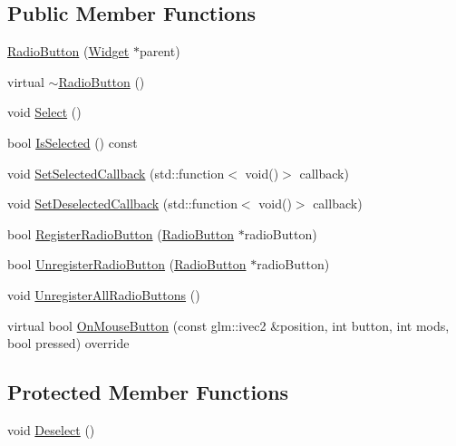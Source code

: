 \subsection*{Public Member Functions}
\begin{DoxyCompactItemize}
\item 
\mbox{\hyperlink{classngl__gui_1_1_radio_button_a919cbf40d57d74418b5a38fe4e6754f2}{Radio\+Button}} (\mbox{\hyperlink{classngl__gui_1_1_widget}{Widget}} $\ast$parent)
\item 
virtual \mbox{\hyperlink{classngl__gui_1_1_radio_button_ab31789870bcefcfc9abc45fa3881a2ef}{$\sim$\+Radio\+Button}} ()
\item 
void \mbox{\hyperlink{classngl__gui_1_1_radio_button_a175e3625d976ea82c99c16f6fa64a5fb}{Select}} ()
\item 
bool \mbox{\hyperlink{classngl__gui_1_1_radio_button_aee5f82544897695560fac4cfa7359016}{Is\+Selected}} () const
\item 
void \mbox{\hyperlink{classngl__gui_1_1_radio_button_a7144c9e2b802a37b829587961314a97e}{Set\+Selected\+Callback}} (std\+::function$<$ void()$>$ callback)
\item 
void \mbox{\hyperlink{classngl__gui_1_1_radio_button_a70e72c9cdba8b96ad0e82f0a3a17b866}{Set\+Deselected\+Callback}} (std\+::function$<$ void()$>$ callback)
\item 
bool \mbox{\hyperlink{classngl__gui_1_1_radio_button_a29196e626ecf49500341062368503de5}{Register\+Radio\+Button}} (\mbox{\hyperlink{classngl__gui_1_1_radio_button}{Radio\+Button}} $\ast$radio\+Button)
\item 
bool \mbox{\hyperlink{classngl__gui_1_1_radio_button_a57b54123f1c2a144ff54dd3b0713e50b}{Unregister\+Radio\+Button}} (\mbox{\hyperlink{classngl__gui_1_1_radio_button}{Radio\+Button}} $\ast$radio\+Button)
\item 
void \mbox{\hyperlink{classngl__gui_1_1_radio_button_a7cf170dd3058219c27abea20249fdc07}{Unregister\+All\+Radio\+Buttons}} ()
\item 
virtual bool \mbox{\hyperlink{classngl__gui_1_1_radio_button_ab1593ae6fbd370c89c6c862a4ee58a92}{On\+Mouse\+Button}} (const glm\+::ivec2 \&position, int button, int mods, bool pressed) override
\end{DoxyCompactItemize}
\subsection*{Protected Member Functions}
\begin{DoxyCompactItemize}
\item 
void \mbox{\hyperlink{classngl__gui_1_1_radio_button_a53a5262bd865fafade28fe859bcd1b4e}{Deselect}} ()
\end{DoxyCompactItemize}
